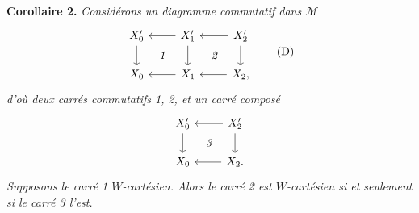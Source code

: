 \documentclass[11pt]{article}
\begin{document}
\textbf{Corollaire 2.} \textit{Considérons un diagramme commutatif dans $\mathcal{M}$}
\[
\begin{tikzcd}[ampersand replacement=\&]
X_0' \arrow[d] \& X_1' \arrow[l] \arrow[d] \arrow[dl, phantom, "\textit{1}"] \& X_2' \arrow[l] \arrow[d] \arrow[dl, phantom, "\textit{2}"] \\
X_0 \& X_1 \arrow[l] \& X_2, \arrow[l]
\end{tikzcd}
\tag*{(D)}
\]
\textit{d'où deux carrés commutatifs 1, 2, et un carré composé}
\[
\begin{tikzcd}[ampersand replacement=\&]
X_0' \arrow[d] \& X_2' \arrow[l] \arrow[d] \arrow[dl, phantom, "\textit{3}"] \\
X_0 \& X_2. \arrow[l]
\end{tikzcd}
\]
\textit{Supposons le carré 1 $W$-cartésien. Alors le carré 2 est $W$-cartésien si et seulement si le carré 3 l'est.}
\end{document}
